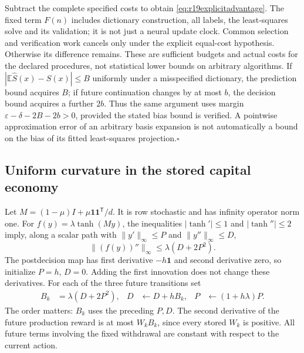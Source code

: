 \documentclass[ecta,nameyear,draft]{econsocart}
\theoremstyle{definition}
\theoremstyle{remark}
\newcommand{\E}{\mathbb E}
\begin{document}
Subtract the complete specified costs to obtain
\eqref{eq:r19explicitadvantage}. The fixed term $F(n)$ includes dictionary
construction, all labels, the least-squares solve and its validation; it is
not just a neural update clock. Common selection and verification work
cancels only under the explicit equal-cost hypothesis. Otherwise its
difference remains. These are sufficient budgets and actual costs for the
declared procedures, not statistical lower bounds on arbitrary algorithms.
If $|\E\widehat S(x)-S(x)|\leq B$ uniformly under a misspecified dictionary,
the prediction bound acquires $B$; if future continuation changes by at most
$b$, the decision bound acquires a further $2b$. Thus the same argument
uses margin $\varepsilon-\delta-2B-2b>0$, provided the stated bias bound is
verified. A pointwise approximation error of an arbitrary basis expansion
is not automatically a bound on the bias of its fitted least-squares
projection.\hfill$\square$

\subsection{Uniform curvature in the stored capital economy}
\label{app:r19curvature}
Let $M=(1-\mu)I+\mu\bm1\bm1^{\mathsf T}/d$. It is row stochastic and
has infinity operator norm one. For $f(y)=\lambda\tanh(My)$, the inequalities
$|\tanh'|\leq1$ and $|\tanh''|\leq2$ imply, along a scalar path with
$\|y'\|_\infty\leq P$ and $\|y''\|_\infty\leq D$,
\begin{equation}
 \|(f(y))''\|_\infty\leq\lambda(D+2P^2).
 \label{eq:r19prodcurv}
\end{equation}
The postdecision map has first derivative $-h\bm1$ and second derivative
zero, so initialize $P=h$, $D=0$. Adding the first innovation does not
change these derivatives. For each of the three future transitions set
\begin{align*}
 B_k&=\lambda(D+2P^2),&
 D&\leftarrow D+hB_k,&P&\leftarrow(1+h\lambda)P.
\end{align*}
The order matters: $B_k$ uses the preceding $P,D$. The second derivative of
the future production reward is at most $W_kB_k$, since every stored $W_k$
is positive. All future terms involving the fixed withdrawal are constant
with respect to the current action.
\end{document}
